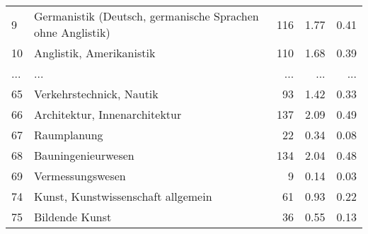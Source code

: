 \begin{longtable}{lXrrr}
        9 & \multicolumn{1}{X}{Germanistik (Deutsch, germanische Sprachen ohne Anglistik)} & %
          \num{116} &
          \num[round-mode=places,round-precision=2]{1,77} &
          \num[round-mode=places,round-precision=2]{0,41} \\
        10 & \multicolumn{1}{X}{Anglistik, Amerikanistik} & %
          \num{110} &
          \num[round-mode=places,round-precision=2]{1,68} &
          \num[round-mode=places,round-precision=2]{0,39} \\
       ... & ... & ... & ... & ... \\
        65 & \multicolumn{1}{X}{Verkehrstechnick, Nautik} & %
          \num{93} &
          \num[round-mode=places,round-precision=2]{1,42} &
          \num[round-mode=places,round-precision=2]{0,33} \\

        66 & \multicolumn{1}{X}{Architektur, Innenarchitektur} & %
          \num{137} &
          \num[round-mode=places,round-precision=2]{2,09} &
          \num[round-mode=places,round-precision=2]{0,49} \\

        67 & \multicolumn{1}{X}{Raumplanung} & %
          \num{22} &
          \num[round-mode=places,round-precision=2]{0,34} &
          \num[round-mode=places,round-precision=2]{0,08} \\

        68 & \multicolumn{1}{X}{Bauningenieurwesen} & %
          \num{134} &
          \num[round-mode=places,round-precision=2]{2,04} &
          \num[round-mode=places,round-precision=2]{0,48} \\

        69 & \multicolumn{1}{X}{Vermessungswesen} & %
          \num{9} &
          \num[round-mode=places,round-precision=2]{0,14} &
          \num[round-mode=places,round-precision=2]{0,03} \\

        74 & \multicolumn{1}{X}{Kunst, Kunstwissenschaft allgemein} & %
          \num{61} &
          \num[round-mode=places,round-precision=2]{0,93} &
          \num[round-mode=places,round-precision=2]{0,22} \\

        75 & \multicolumn{1}{X}{Bildende Kunst} & %
          \num{36} &
          \num[round-mode=places,round-precision=2]{0,55} &
          \num[round-mode=places,round-precision=2]{0,13} \\


\end{longtable}
